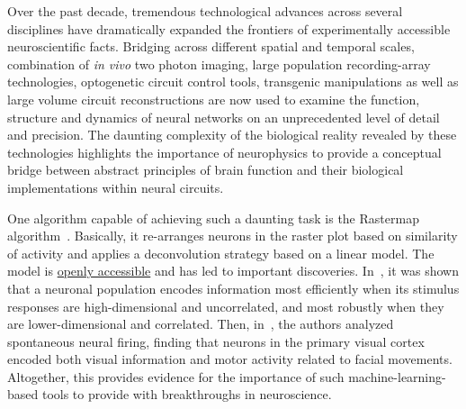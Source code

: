 \documentclass[brainsci, %
               review,submit,pdftex,moreauthors
               ]{Definitions/mdpi}
\begin{document}
Over the past decade, tremendous technological advances across several disciplines have dramatically expanded the frontiers of experimentally accessible neuroscientific facts. Bridging across different spatial and temporal scales, combination of \textit{in vivo} two photon imaging, large population recording-array technologies, optogenetic circuit control tools, transgenic manipulations as well as large volume circuit reconstructions are now used to examine the function, structure and dynamics of neural networks on an unprecedented level of detail and precision. The daunting complexity of the biological reality revealed by these technologies highlights the importance of neurophysics to provide a conceptual bridge between abstract principles of brain function and their biological implementations within neural circuits. 

One algorithm capable of achieving such a daunting task is the Rastermap algorithm~\citep{pachitariu_robustness_2018}. Basically, it re-arranges neurons in the raster plot based on similarity of activity and applies a deconvolution strategy based on a linear model. The model is \href{https://github.com/MouseLand/rastermap}{openly accessible} and has led to important discoveries. In~\citet{stringer_spontaneous_2019,stringer_high-dimensional_2019}, it was shown that a neuronal population encodes information most efficiently when its stimulus responses are high-dimensional and uncorrelated, and most robustly when they are lower-dimensional and correlated. 
Then, in~\citep{stringer_high-precision_2021}, the authors analyzed spontaneous neural firing, finding that neurons in the primary visual cortex encoded both visual information and motor activity related to facial movements. Altogether, this provides evidence for the importance of such machine-learning-based tools to provide with breakthroughs in neuroscience.
\end{document}
